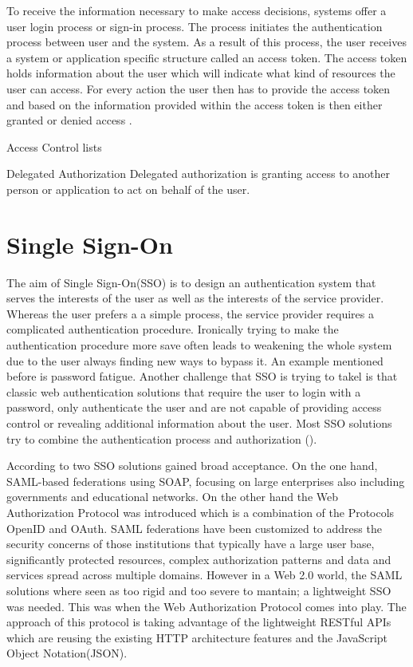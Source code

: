 To receive the information necessary to make access decisions,  systems offer a user login process or sign-in process. The process initiates the authentication process between user and the system. As a result of this process, the user receives a system or application specific structure called an access token. The access token holds information about the user which will indicate what kind of resources the user can access. For every action the user then has to provide the access token and based on the information provided within the access token is then either granted or denied access \cite{Todorov:2007:MUI}. 


Access Control lists

Delegated Authorization
Delegated authorization is granting access to another person or application to act on behalf of the user.
\cite{Boyed:2012:GSOA}


\section{Single Sign-On}

The aim of Single Sign-On(SSO) is to design an authentication system that serves the interests of the user as well as the interests of the service provider. Whereas the user prefers a a simple process, the service provider requires a complicated authentication procedure. Ironically trying to make the authentication procedure more save often leads to weakening the whole system due to the user always  finding new ways to bypass it. An example mentioned before is password fatigue. Another challenge that SSO is trying to takel is that classic web authentication solutions that require the user to login with a password, only authenticate the user and are not capable of providing access control or revealing additional information about the user. Most SSO solutions try to combine the authentication process and authorization (\cite{Prochazka:2010:UCA}).

According to \cite{Lynch:2017:IIG} two SSO solutions gained broad acceptance. On the one hand, SAML-based federations using SOAP, focusing on large enterprises also including governments and educational networks. On the other hand the Web Authorization Protocol was introduced which is a combination of the Protocols OpenID and OAuth. SAML federations have been customized to address the security concerns of those institutions that typically have a large user base, significantly protected resources, complex authorization patterns and data and services spread across multiple domains. However in a Web 2.0 world, the SAML solutions where seen as too rigid and too severe to mantain; a lightweight SSO was needed. This was when the Web Authorization Protocol comes into play. The approach of this protocol is taking advantage of the lightweight RESTful APIs which are reusing the existing HTTP architecture features and the JavaScript Object Notation(JSON).

